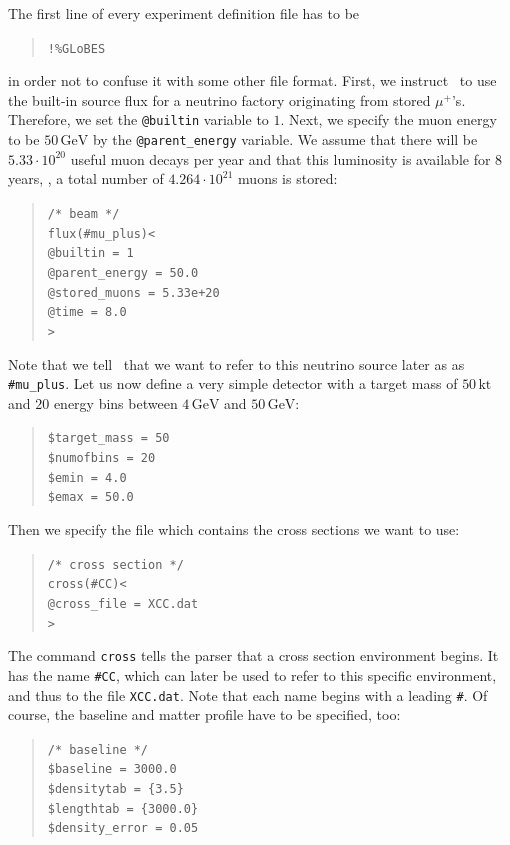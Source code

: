 The first line of every experiment definition file has to be
\begin{quote}
{\tt !\%GLoBES}
\end{quote}
in order not to confuse it with some other file format.
%
First, we instruct \GLOBES\ to use the built-in source flux for a neutrino factory
originating from stored $\mu^+$'s. Therefore, we set the {\tt @builtin} variable to $1$. Next, we specify the muon energy to be $50\,\mathrm{GeV}$ by the {\tt @parent\_energy} variable. We assume 
that there will be $5.33\cdot 10^{20}$ useful muon decays per year
and that this luminosity is available for $8$ years, \ie , a total number
of $ 4.264\cdot10^{21}$ muons is stored:
\begin{quote}
{\tt /* beam */}\\
{\tt flux(\#mu\_plus)<\\
\tb  @builtin = 1\\
\tb  @parent\_energy = 50.0\\
\tb  @stored\_muons = 5.33e+20\\
\tb  @time = 8.0\\
>}\\
\end{quote}
Note that we tell \GLOBES\ that we want to refer to this neutrino source later as as {\tt \#mu\_plus}. 
%
Let us now define a very simple detector with a target mass 
of $50\,\mathrm{kt}$ and $20$ energy bins between
$4\,\mathrm{GeV}$ and $50\,\mathrm{GeV}$: 
\begin{quote}
{\tt \$target\_mass = 50}\\
{\tt \$numofbins = 20}\\
{\tt \$emin = 4.0}\\
{\tt \$emax = 50.0}
\end{quote}
Then we specify the file which contains the cross sections we want to 
use:
\begin{quote}
{\tt /* cross section */}\\
{\tt cross(\#CC)<}\\
{\tt \tb @cross\_file = XCC.dat}\\
{\tt >}
\end{quote}
The command {\tt cross} tells the parser that a cross section environment
begins. It has the name {\tt \#CC}, which can later be used to refer 
to this specific environment, and thus to the file {\tt XCC.dat}. Note that each name begins with a leading {\tt \#}.
%
Of course, the baseline and matter profile have to be specified, too:
\begin{quote}
{\tt /* baseline */}\\
{\tt \$baseline = 3000.0}\\
{\tt \$densitytab = \{3.5\}}\\
{\tt \$lengthtab = \{3000.0\}}\\
{\tt \$density\_error = 0.05}
\end{quote}
